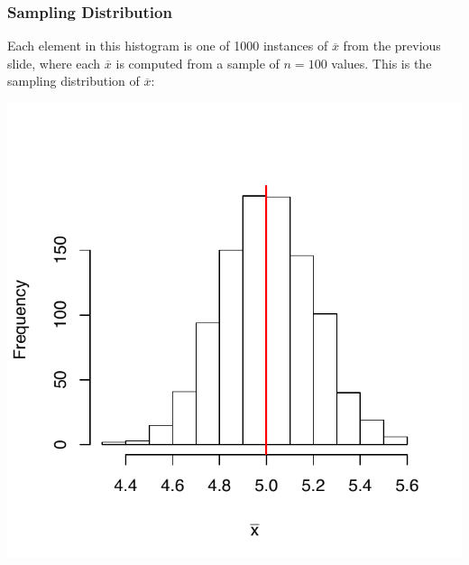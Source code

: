 \documentclass[handout]{beamer}
\newcommand{\blue}[1]{\textcolor{blue2}{#1}}
\newcommand{\xbar}{\overline{x}}
\begin{document}
\begin{frame}
\frametitle{Sampling Distribution}
Each element in this histogram is one of 1000 instances of $\xbar$ from the previous slide, where each $\xbar$ is computed from a sample of $n=100$ values.  This is the \blue{sampling distribution} of $\xbar$:
\begin{center}
\includegraphics{figure/lec12-001}
\end{center}
\end{frame}
\end{document}
